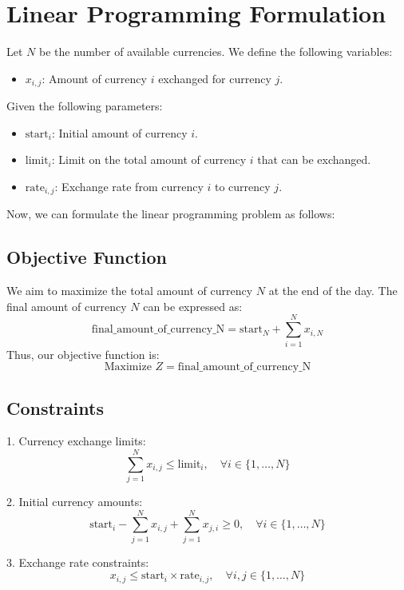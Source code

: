 \documentclass{article}
\begin{document}
\section*{Linear Programming Formulation}

Let \( N \) be the number of available currencies. We define the following variables:

\begin{itemize}
    \item \( x_{i,j} \): Amount of currency \( i \) exchanged for currency \( j \).
\end{itemize}

Given the following parameters:

\begin{itemize}
    \item \( \text{start}_i \): Initial amount of currency \( i \).
    \item \( \text{limit}_i \): Limit on the total amount of currency \( i \) that can be exchanged.
    \item \( \text{rate}_{i,j} \): Exchange rate from currency \( i \) to currency \( j \).
\end{itemize}

Now, we can formulate the linear programming problem as follows:

\subsection*{Objective Function}
We aim to maximize the total amount of currency \( N \) at the end of the day. The final amount of currency \( N \) can be expressed as:
\[
\text{final\_amount\_of\_currency\_N} = \text{start}_N + \sum_{i=1}^{N} x_{i,N}
\]
Thus, our objective function is:
\[
\text{Maximize } Z = \text{final\_amount\_of\_currency\_N}
\]

\subsection*{Constraints}

1. Currency exchange limits:
\[
\sum_{j=1}^{N} x_{i,j} \leq \text{limit}_i, \quad \forall i \in \{1, \ldots, N\}
\]

2. Initial currency amounts:
\[
\text{start}_i - \sum_{j=1}^{N} x_{i,j} + \sum_{j=1}^{N} x_{j,i} \geq 0, \quad \forall i \in \{1, \ldots, N\}
\]

3. Exchange rate constraints:
\[
x_{i,j} \leq \text{start}_i \times \text{rate}_{i,j}, \quad \forall i,j \in \{1, \ldots, N\}
\]
\end{document}
